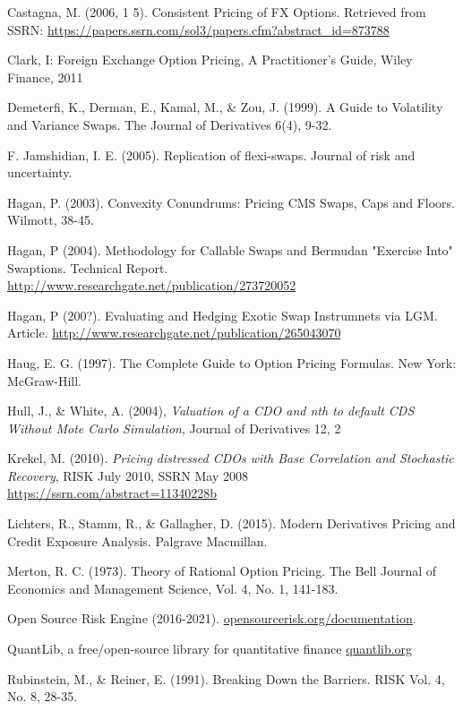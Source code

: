 \begin{thebibliography}{*}
 Castagna, M. (2006, 1 5). Consistent Pricing of FX Options. Retrieved from SSRN: \url{https://papers.ssrn.com/sol3/papers.cfm?abstract\_id=873788}

 Clark, I: Foreign Exchange Option Pricing, A Practitioner's Guide, Wiley Finance, 2011

 Demeterfi, K., Derman, E., Kamal, M., \& Zou, J. (1999). A Guide to Volatility and Variance Swaps. The Journal of Derivatives 6(4), 9-32.

 F. Jamshidian, I. E. (2005). Replication of flexi-swaps. Journal of risk and uncertainty.

 Hagan, P. (2003). Convexity Conundrums: Pricing CMS Swaps, Caps and Floors. Wilmott, 38-45.

 Hagan, P (2004). Methodology for Callable Swaps and Bermudan "Exercise Into"
  Swaptions. Technical Report. \url{http://www.researchgate.net/publication/273720052}

 Hagan, P (200?). Evaluating and Hedging Exotic Swap Instrumnets via
  LGM. Article. \url{http://www.researchgate.net/publication/265043070}

 Haug, E. G. (1997). The Complete Guide to Option Pricing Formulas. New York: McGraw-Hill.

 Hull, J., \& White, A. (2004), {\em Valuation of a CDO and nth to default CDS Without Mote Carlo Simulation}, Journal of Derivatives 12, 2

 Krekel, M. (2010). {\em Pricing distressed CDOs with Base Correlation and Stochastic Recovery}, RISK July 2010, SSRN May 2008 \url{https://ssrn.com/abstract=11340228b}

 Lichters, R., Stamm, R., \& Gallagher, D. (2015). Modern Derivatives Pricing and Credit Exposure Analysis. Palgrave Macmillan.

 Merton, R. C. (1973). Theory of Rational Option Pricing. The Bell Journal of Economics and Management Science, Vol. 4, No. 1, 141-183.

 Open Source Risk Engine (2016-2021). \url{opensourcerisk.org/documentation}.

 QuantLib, a free/open-source library for quantitative finance \url{quantlib.org}

 Rubinstein, M., \& Reiner, E. (1991). Breaking Down the Barriers. RISK Vol. 4, No. 8, 28-35.


\end{thebibliography}
